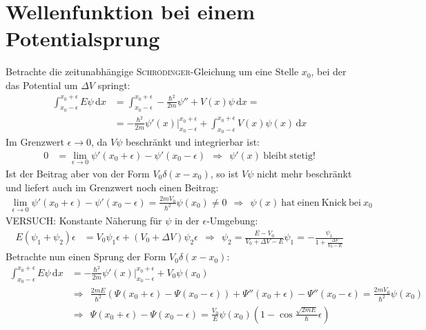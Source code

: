 \documentclass[a4paper,12pt]{article}
\begin{document}
\section{Wellenfunktion bei einem Potentialsprung}
Betrachte die zeitunabhängige \textsc{Schrödinger}-Gleichung um eine Stelle $x_0$, bei der das Potential um $\Delta V$ springt:
\begin{align*}
\int_{x_0-\epsilon}^{x_0+\epsilon}E\psi\,\mathrm{d}x &=\int_{x_0-\epsilon}^{x_0+\epsilon}-\frac{\hbar^2}{2m}\psi ''+V(x)\psi\,\mathrm{d}x= \\
&=-\frac{\hbar^2}{2m}\psi'(x)\bigg\vert_{x_0-\epsilon}^{x_0+\epsilon}+\int_{x_0-\epsilon}^{x_0+\epsilon}V(x)\psi(x)\,\mathrm{d}x
\end{align*}
Im Grenzwert $\epsilon\rightarrow 0$, da $V\psi$ beschränkt und integrierbar ist:
\begin{align*}
0&=\lim_{\epsilon\rightarrow 0}\psi'(x_0+\epsilon)-\psi'(x_0-\epsilon)\ \ \Rightarrow\ \ \psi'(x)\ \mathrm{bleibt\ stetig!}
\end{align*}
Ist der Beitrag aber von der Form $V_0\delta (x-x_0)$, so ist $V\psi$ nicht mehr beschränkt und liefert auch im Grenzwert noch einen Beitrag:
\begin{align*}
\lim_{\epsilon\rightarrow 0}\psi'(x_0+\epsilon)-\psi'(x_0-\epsilon)=\frac{2mV_0}{\hbar^2}\psi(x_0)\neq 0\ \ \Rightarrow\ \ \psi(x)\  \mathrm{hat\ einen\ Knick\ bei\ }x_0
\end{align*}
VERSUCH: Konstante Näherung für $\psi$ in der $\epsilon$-Umgebung:
\begin{align*}
E(\psi_1+\psi_2)\epsilon &=V_0\psi_1\epsilon + (V_0+\Delta V)\psi_2\epsilon\ \ \Rightarrow\ \ \psi_2 = \frac{E -V_0}{V_0+\Delta V-E}\psi_1 = -\frac{\psi_1}{1+\frac{\Delta V}{V_0-E}}
\end{align*} 
Betrachte nun einen Sprung der Form $V_0\delta (x-x_0)$:
\begin{align*}
\int_{x_0-\epsilon}^{x_0+\epsilon}E\psi\,\mathrm{d}x &=-\frac{\hbar^2}{2m}\psi'(x)\bigg\vert_{x_0-\epsilon}^{x_0+\epsilon} +V_0\psi(x_0)\\ 
&\Rightarrow\ \ \frac{2mE}{\hbar^2}(\Psi(x_0+\epsilon)-\Psi(x_0-\epsilon))+\Psi''(x_0+\epsilon)-\Psi''(x_0-\epsilon)=\frac{2mV_0}{\hbar^2}\psi (x_0)\\
&\Rightarrow\ \ \Psi(x_0+\epsilon)-\Psi(x_0-\epsilon)=\frac{V_0}{E}\psi(x_0)\left(1-\cos\frac{\sqrt{2mE}}{\hbar}\epsilon\right)
\end{align*}
\end{document}
